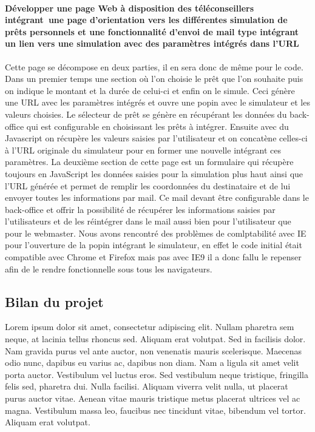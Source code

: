 \documentclass[a4paper,11pt,twoside]{report}
\begin{document}
      \paragraph*{Développer une page Web à disposition des téléconseillers intégrant une page d’orientation vers les différentes simulation de prêts personnels et une fonctionnalité d’envoi de mail type intégrant un lien vers une simulation avec des paramètres intégrés dans l’URL}
      Cette page se décompose en deux parties, il en sera donc de même pour le code. Dans un premier temps une section où l'on choisie le prêt que l'on souhaite puis on indique le montant et la durée de celui-ci et enfin on le simule. Ceci génère une URL avec les paramètres intégrés et ouvre une popin avec le simulateur et les valeurs choisies. Le sélecteur de prêt se génère en récupérant les données du back-office qui est configurable en choisissant les prêts à intégrer. Ensuite avec du Javascript on récupère les valeurs saisies par l'utilisateur et on concatène celles-ci à l'URL originale du simulateur pour en former une nouvelle intégrant ces paramètres. 
      La deuxième section de cette page est un formulaire qui récupère toujours en JavaScript les données saisies pour la simulation plus haut ainsi que l'URL générée et permet de remplir les coordonnées du destinataire et de lui envoyer toutes les informations par mail. Ce mail devant être configurable dans le back-office et offrir la possibilité de récupérer les informations saisies par l'utilisateurs et de les réintégrer dans le mail aussi bien pour l'utilisateur que pour le webmaster. 
      Nous avons rencontré des problèmes de comlptabilité avec IE pour l'ouverture de la popin intégrant le simulateur, en effet le code initial était compatible avec Chrome et Firefox mais pas avec IE9 il a donc fallu le repenser afin de le rendre fonctionnelle sous tous les navigateurs.
    \subsection*{Bilan du projet}
    Lorem ipsum dolor sit amet, consectetur adipiscing elit. Nullam pharetra sem neque, at lacinia tellus rhoncus sed. Aliquam erat volutpat. Sed in facilisis dolor. Nam gravida purus vel ante auctor, non venenatis mauris scelerisque. Maecenas odio nunc, dapibus eu varius ac, dapibus non diam. Nam a ligula sit amet velit porta auctor. Vestibulum vel luctus eros. Sed vestibulum neque tristique, fringilla felis sed, pharetra dui. Nulla facilisi. Aliquam viverra velit nulla, ut placerat purus auctor vitae. Aenean vitae mauris tristique metus placerat ultrices vel ac magna. Vestibulum massa leo, faucibus nec tincidunt vitae, bibendum vel tortor. Aliquam erat volutpat.
    
\end{document}
